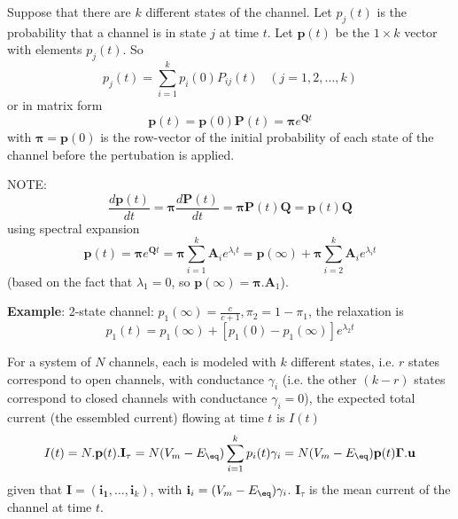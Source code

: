 Suppose that there are $k$ different states of the channel.
Let $p_j(t)$ is the probability that a channel is in state $j$ at time $t$. Let
$\mathbf{p}(t)$ be the $1\times k$ vector with elements $p_j(t)$. So
\begin{equation}
p_j(t) = \sum_{i=1}^k p_i(0)P_{ij}(t) \;\;\; (j=1,2,\ldots,k)
\end{equation}
or in matrix form
\begin{equation}
\mathbf{p}(t) = \mathbf{p}(0)\mathbf{P}(t) = \mathbf{\pi}e^{\mathbf{Q}t}
\end{equation}
with $\mathbf{\pi}= \mathbf{p}(0)$ is the row-vector of the initial
probability of each state of the channel before the pertubation is applied.

NOTE:
\begin{equation}
\frac{d\mathbf{p}(t)}{dt} = \mathbf{\pi}\frac{d\mathbf{P}(t)}{dt} =
\mathbf{\pi}\mathbf{P}(t) \mathbf{Q} = \mathbf{p}(t)\mathbf{Q}
\end{equation}
using spectral expansion
\begin{equation}
\mathbf{p}(t)=\mathbf{\pi}e^{\mathbf{Q}t}=\mathbf{\pi}\sum_{i=1}^k
\mathbf{A}_i e^{\lambda_it} = \mathbf{p}(\infty) + \mathbf{\pi}\sum_{i=2}^k
\mathbf{A}_i e^{\lambda_it}
\end{equation}
(based on the fact that $\lambda_1=0$, so
$\mathbf{p}(\infty)=\mathbf{\pi}.\mathbf{A}_1$).

{\bf Example}: 2-state channel: $p_1(\infty) = \frac{c}{c+1}, \pi_2 =
1-\pi_1$, the relaxation is
\begin{equation}
p_1(t) = p_1(\infty) + \left[ p_1(0) -p_1(\infty) \right] e^{\lambda_2 t}
\end{equation}

For a system of $N$ channels, each is modeled with $k$ different states, i.e.
$r$ states correspond to open channels, with conductance $\gamma_i$ (i.e. the
other $(k-r)$ states correspond to closed channels with conductance
$\gamma_i=0$), the expected total current (the essembled current) flowing at
time $t$ is $I(t)$
\begin{equation}
I(t) = N .\mathbf{p}(t). \mathbf{I}_\tau = N (V_m-E_\eq) \sum\limits_{i=1}^k
p_i(t)\gamma_i = N(V_m-E_\eq)\mathbf{p}(t) \mathbf{\Gamma.u}
\end{equation}
given that $\mathbf{I}=(\mathbf{i_1},\ldots,\mathbf{i}_k)$, with $\mathbf{i}_i
= (V_m-E_\eq) \gamma_i$.  $\mathbf{I}_\tau$ is the mean current of the channel
at time $t$.

